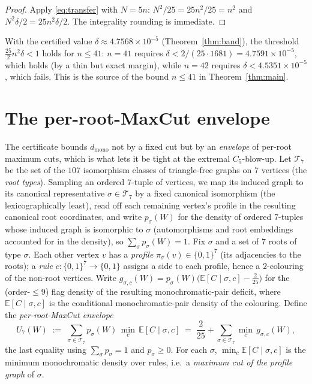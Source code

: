 \documentclass[11pt]{article}
\theoremstyle{remark}
\newcommand{\dmono}{d_{\mathrm{mono}}}
\begin{document}
\begin{proof}
Apply \eqref{eq:transfer} with $N=5n$: $N^2/25=25n^2/25=n^2$ and
$N^2\delta/2=25n^2\delta/2$. The integrality rounding is immediate.
\end{proof}

With the certified value $\delta\approx 4.7568\times10^{-5}$
(Theorem~\ref{thm:band}), the threshold $\tfrac{25}{2}n^2\delta<1$ holds for
$n\le 41$: $n=41$ requires $\delta<2/(25\cdot 1681)=4.7591\times10^{-5}$, which holds
(by a thin but exact margin), while $n=42$ requires $\delta<4.5351\times10^{-5}$,
which fails. This is the source of the bound $n\le 41$ in Theorem~\ref{thm:main}.

\section{The per-root-MaxCut envelope}\label{sec:env}

The certificate bounds $\dmono$ not by a fixed cut but by an \emph{envelope} of
per-root maximum cuts, which is what lets it be tight at the extremal
$C_5$-blow-up. Let $\mathcal{T}_7$ be the set of the $107$ isomorphism classes of triangle-free
graphs on $7$ vertices (the \emph{root types}). Sampling an ordered $7$-tuple of
vertices, we map its induced graph to its canonical representative
$\sigma\in\mathcal{T}_7$ by a fixed canonical isomorphism (the lexicographically
least), read off each remaining vertex's profile in the resulting canonical root
coordinates, and write $p_\sigma(W)$ for the density of ordered $7$-tuples whose
induced graph is isomorphic to $\sigma$ (automorphisms and root embeddings
accounted for in the density), so $\sum_\sigma p_\sigma(W)=1$. Fix $\sigma$ and a set of $7$ roots of type $\sigma$. Each other
vertex $v$ has a \emph{profile} $\pi_\sigma(v)\in\{0,1\}^7$ (its adjacencies to the
roots); a \emph{rule} $c\colon\{0,1\}^7\to\{0,1\}$ assigns a side to each profile,
hence a $2$-colouring of the non-root vertices. Write
$g_{\sigma,c}(W)=p_\sigma(W)\bigl(\mathbb{E}[C\mid\sigma,c]-\tfrac{2}{25}\bigr)$ for
the (order-$\le 9$) flag density of the resulting monochromatic-pair deficit, where
$\mathbb{E}[C\mid\sigma,c]$ is the conditional monochromatic-pair density of the
colouring. Define the \emph{per-root-MaxCut envelope}
\[
  U_7(W)\;:=\;\sum_{\sigma\in\mathcal{T}_7}p_\sigma(W)\,\min_c\,\mathbb{E}[C\mid\sigma,c]
        \;=\;\frac{2}{25}+\sum_{\sigma\in\mathcal{T}_7}\min_c\,g_{\sigma,c}(W),
\]
the last equality using $\sum_\sigma p_\sigma=1$ and $p_\sigma\ge 0$. For each
$\sigma$, $\min_c\mathbb{E}[C\mid\sigma,c]$ is the minimum monochromatic density
over rules, i.e.\ a \emph{maximum cut of the profile graph} of $\sigma$.
\end{document}
